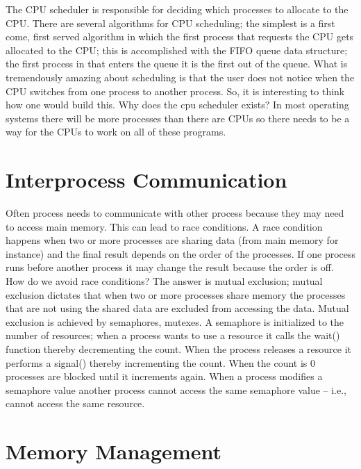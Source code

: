 \documentclass{amsbook}
\begin{document}
The CPU scheduler is responsible for deciding which processes to allocate to the CPU. There are several algorithms for CPU scheduling; the simplest is a first come, first served algorithm in which the first process that requests the CPU gets allocated to the CPU; this is accomplished with the FIFO queue data structure; the first process in that enters the queue it is the first out of the queue. What is tremendously amazing about scheduling is that the user does not notice when the CPU switches from one process to another process. So, it is interesting to think how one would build this. Why does the cpu scheduler exists? In most operating systems there will be more processes than there are CPUs so there needs to be a way for the CPUs to work on all of these programs. 

\section{Interprocess Communication}

Often process needs to communicate with other process because they may need to access main memory. This can lead to race conditions. A race condition happens when two or more processes are sharing data (from main memory for instance) and the final result depends on the order of the processes. If one process runs before another process it may change the result because the order is off. How do we avoid race conditions? The answer is mutual exclusion; mutual exclusion dictates that when two or more processes share memory the processes that are not using the shared data are excluded from accessing the data. Mutual exclusion is achieved by semaphores, mutexes. A semaphore is initialized to the number of resources; when a process wants to use a resource it calls the wait() function thereby decrementing the count. When the process releases a resource it performs a signal() thereby incrementing the count. When the count is 0 processes are blocked until it increments again. When a process modifies a semaphore value another process cannot access the same semaphore value -- i.e., cannot access the same resource.

\section{Memory Management}
\end{document}
